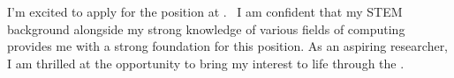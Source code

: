



I'm excited to apply for the \position\;position at \company.
\areaofinterest\, 
I am confident that my STEM background alongside my strong 
knowledge of various fields of computing provides me with 
a strong foundation for this position. 
As an aspiring researcher, 
I am thrilled at the opportunity 
to bring my interest to life through the \company.